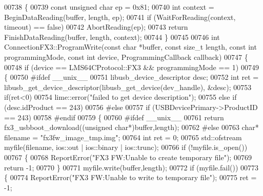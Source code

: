 \begin{DoxyCode}
{{{{00738 \{
00739     \textcolor{keyword}{const} \textcolor{keywordtype}{unsigned} \textcolor{keywordtype}{char} ep = 0x81;
00740     \textcolor{keywordtype}{int} context = BeginDataReading(buffer, length, ep);
00741     \textcolor{keywordflow}{if} (WaitForReading(context, timeout) == \textcolor{keyword}{false})
00742         AbortReading(ep);
00743     \textcolor{keywordflow}{return} FinishDataReading(buffer, length, context);
00744 \}
00745 
00746 \textcolor{keywordtype}{int} ConnectionFX3::ProgramWrite(\textcolor{keyword}{const} \textcolor{keywordtype}{char} *buffer, \textcolor{keyword}{const} \textcolor{keywordtype}{size\_t} length, \textcolor{keyword}{const} \textcolor{keywordtype}{int} programmingMode, \textcolor{keyword}{const} \textcolor{keywordtype}{
      int} device, ProgrammingCallback callback)
00747 \{
00748     \textcolor{keywordflow}{if} (device == LMS64CProtocol::FX3 && programmingMode == 1)
00749     \{
00750 \textcolor{preprocessor}{#ifdef \_\_unix\_\_}
00751         libusb\_device\_descriptor desc;
00752         \textcolor{keywordtype}{int} ret = libusb\_get\_device\_descriptor(libusb\_get\_device(dev\_handle), &desc);
00753         \textcolor{keywordflow}{if}(ret<0)
00754             lime::error(\textcolor{stringliteral}{"failed to get device description"});
00755         \textcolor{keywordflow}{else} \textcolor{keywordflow}{if} (desc.idProduct == 243)
00756 \textcolor{preprocessor}{#else}
00757         \textcolor{keywordflow}{if} (USBDevicePrimary->ProductID == 243)
00758 \textcolor{preprocessor}{#endif}
00759         \{
00760 \textcolor{preprocessor}{#ifdef \_\_unix\_\_}
00761             \textcolor{keywordflow}{return} fx3\_usbboot\_download((\textcolor{keywordtype}{unsigned} \textcolor{keywordtype}{char}*)buffer,length);
00762 \textcolor{preprocessor}{#else}
00763             \textcolor{keywordtype}{char}* filename = \textcolor{stringliteral}{"fx3fw\_image\_tmp.img"};
00764             \textcolor{keywordtype}{int} ret = 0;
00765             std::ofstream myfile(filename, ios::out | ios::binary | ios::trunc);
00766             \textcolor{keywordflow}{if} (!myfile.is\_open())
00767             \{
00768                 ReportError(\textcolor{stringliteral}{"FX3 FW:Unable to create temporary file"});
00769                 \textcolor{keywordflow}{return} -1;
00770             \}
00771             myfile.write(buffer,length);
00772             \textcolor{keywordflow}{if} (myfile.fail())
00773             \{
00774                 ReportError(\textcolor{stringliteral}{"FX3 FW:Unable to write to temporary file"});
00775                 ret = -1;
}}}}
\end{DoxyCode}

